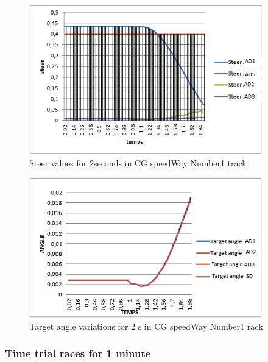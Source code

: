 \documentclass{llncs}
\begin{document}
\begin{figure}[h!]
	
	\centering
	\includegraphics[width=0.9\textwidth]{fig/steertest.png}
	\begin{minipage}{10cm}
		\centering
		\caption{\footnotesize  Steer values for 2seconds in CG speedWay Number1 track}
		\label{steertst}
	\end{minipage} 
	
\end{figure}	

\begin{figure}[h!]	
	\centering
	\includegraphics[width=0.9\textwidth]{fig/angletest.png}
	\begin{minipage}{10cm}
		\centering
		\caption{\footnotesize   Target angle variations for 2 s in CG speedWay Number1 rack }
		\label{steertst2}
	\end{minipage} 
	
\end{figure}
\subsubsection{Time trial races for 1 minute}
\end{document}

